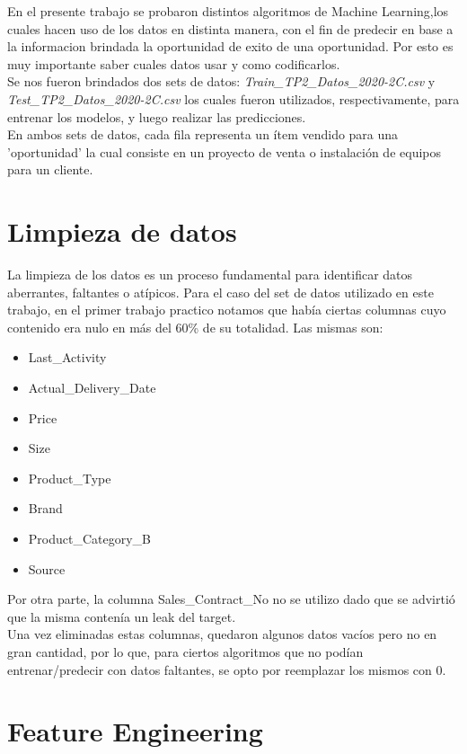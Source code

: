 \documentclass[12pt,a4paper]{article}
\begin{document}
En el presente trabajo se probaron distintos algoritmos de Machine Learning,los cuales hacen uso de los datos en distinta manera, con el fin de predecir en base a la informacion brindada la oportunidad de exito de una oportunidad.
Por esto es muy importante saber cuales datos usar y como codificarlos. \\

Se nos fueron brindados dos sets de datos: 
\newline
\textit{Train\_TP2\_Datos\_2020-2C.csv} y \textit{Test\_TP2\_Datos\_2020-2C.csv}
los cuales fueron utilizados, respectivamente, para entrenar los modelos, y luego realizar las predicciones. \\
En ambos sets de datos, cada fila representa un ítem
vendido para una ’oportunidad’ la cual consiste en un proyecto de venta o instalación de equipos para un cliente.
 

\newpage
  

\section{Limpieza de datos}
La limpieza de los datos es un proceso fundamental para identificar datos aberrantes, faltantes o atípicos. Para el caso del set de datos utilizado en este trabajo, en el primer trabajo practico notamos que había ciertas columnas cuyo contenido era nulo en más del 60\% de su totalidad. 
Las mismas son:
\begin{itemize}
    \item Last\_Activity
    \item Actual\_Delivery\_Date
    \item Price
    \item Size
    \item Product\_Type
    \item Brand
    \item Product\_Category\_B
    \item Source 
\end{itemize}
Por otra parte, la columna Sales\_Contract\_No no se utilizo dado que se advirtió que la misma contenía un leak del target. \\
Una vez eliminadas estas columnas, quedaron algunos datos vacíos pero no en gran cantidad, por lo que, para ciertos algoritmos que no podían entrenar/predecir con datos faltantes, se opto por reemplazar los mismos con 0.

\section{Feature Engineering}
\end{document}
